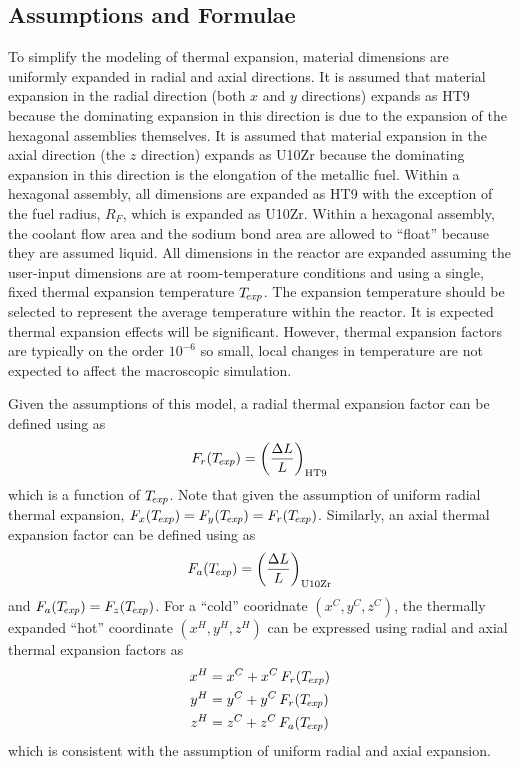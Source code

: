   \subsection{Assumptions and Formulae}
  \label{sec:model_details__assumptions_and_formulae}
    To simplify the modeling of thermal expansion, material dimensions are
    uniformly expanded in radial and axial directions. It is assumed that 
    material expansion in the radial direction (both $x$ and $y$ directions) 
    expands as HT9 because the dominating expansion in this direction is due to 
    the expansion of the hexagonal assemblies themselves. It is assumed that
    material expansion in the axial direction (the $z$ direction) expands as 
    U10Zr because the dominating expansion in this direction is the elongation 
    of the metallic fuel. Within a hexagonal assembly, all dimensions are 
    expanded as HT9 with the exception of the fuel radius, $R_F$, which is 
    expanded as U10Zr. Within a hexagonal assembly, the coolant flow area and 
    the sodium bond area are allowed to ``float'' because they are assumed 
    liquid. All dimensions in the reactor are expanded assuming the user-input 
    dimensions are at room-temperature conditions and using a single, fixed 
    thermal expansion temperature $T_{\!\mbox{\scriptsize \em exp}}$. The expansion temperature should be 
    selected to represent the average temperature within the reactor. It is 
    expected thermal expansion effects will be significant. However, thermal 
    expansion factors are typically on the order $10^{-6}$ so small, local 
    changes in temperature are not expected to affect the macroscopic 
    simulation.

    Given the assumptions of this model, a radial thermal expansion factor can 
    be defined using  as
    \begin{equation}
      \label{eq:lef_r}
      F_r(T_{\!\mbox{\scriptsize \em exp}}) = \left(\frac{\Delta L}{L}\right)_{\text{HT9}}
    \end{equation}
    which is a function of $T_{\!\mbox{\scriptsize \em exp}}$. Note that given the assumption of uniform
    radial thermal expansion, ${F_x(T_{\!\mbox{\scriptsize \em exp}}) = F_y(T_{\!\mbox{\scriptsize \em exp}}) = F_r(T_{\!\mbox{\scriptsize \em exp}})}$.
    Similarly, an axial thermal expansion factor can be defined using
     as 
    \begin{equation}
      \label{eq:lef_a}
      F_a(T_{\!\mbox{\scriptsize \em exp}}) = \left(\frac{\Delta L}{L}\right)_{\text{U10Zr}}
    \end{equation}
    and $F_a(T_{\!\mbox{\scriptsize \em exp}}) = F_z(T_{\!\mbox{\scriptsize \em exp}})$. For a ``cold'' cooridnate 
    $(x^C,y^C,z^C)$, the thermally expanded ``hot'' coordinate $(x^H,y^H,z^H)$ 
    can be expressed using radial and axial thermal expansion factors as
    \begin{align}
      \label{eq:expand_x}
      x^H &= x^C + x^C \, F_r(T_{\!\mbox{\scriptsize \em exp}}) \\
      \label{eq:expand_y}
      y^H &= y^C + y^C \, F_r(T_{\!\mbox{\scriptsize \em exp}}) \\
      \label{eq:expand_z}
      z^H &= z^C + z^C \, F_a(T_{\!\mbox{\scriptsize \em exp}})
    \end{align}
    which is consistent with the assumption of uniform radial and axial 
    expansion.

